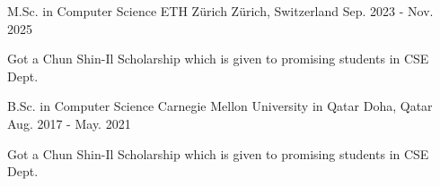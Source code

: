 

\begin{cventries}

\cventry
{M.Sc. in Computer Science} %
{ETH Zürich} %
{Zürich, Switzerland} %
{Sep. 2023 - Nov. 2025} %
{
  \begin{cvitems} %
    \item {Got a Chun Shin-Il Scholarship which is given to promising students in CSE Dept.}
  \end{cvitems}
}

\cventry
{B.Sc. in Computer Science} %
{Carnegie Mellon University in Qatar} %
{Doha, Qatar} %
{Aug. 2017 - May. 2021} %
{
  \begin{cvitems} %
    \item {Got a Chun Shin-Il Scholarship which is given to promising students in CSE Dept.}
  \end{cvitems}
}

\end{cventries}
